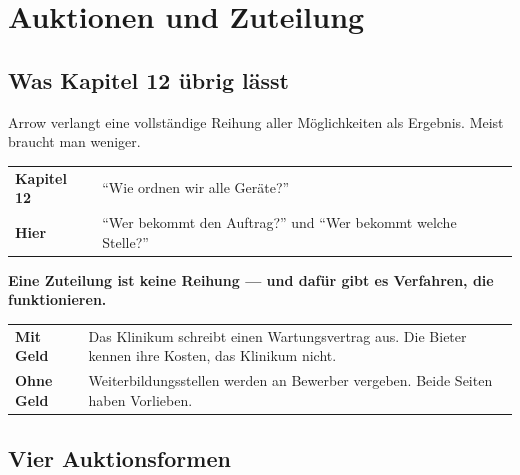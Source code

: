 \chapter{Auktionen und Zuteilung}

\section{Was Kapitel 12 übrig lässt}

\begin{merksatz}
Arrow verlangt eine vollständige Reihung aller Möglichkeiten als Ergebnis. Meist braucht man weniger.

\begin{center}
{\small
\renewcommand{\arraystretch}{1.5}
\begin{tabular}{@{}P{2.4cm}P{6.2cm}@{}}
\toprule
\textbf{Kapitel 12} & \enquote{Wie ordnen wir alle Geräte?}\\
\textbf{Hier} & \enquote{Wer bekommt den Auftrag?} und \enquote{Wer bekommt welche Stelle?}\\
\bottomrule
\end{tabular}}
\end{center}

\begin{center}
\begin{minipage}{0.9\textwidth}
\textbf{Eine Zuteilung ist keine Reihung --- und dafür gibt es Verfahren, die funktionieren.}
\end{minipage}
\end{center}

\begin{center}
{\small
\renewcommand{\arraystretch}{1.5}
\begin{tabular}{@{}P{2.4cm}P{6.2cm}@{}}
\toprule
\textbf{Mit Geld} & Das Klinikum schreibt einen Wartungsvertrag aus. Die Bieter kennen ihre Kosten, das Klinikum nicht.\\
\textbf{Ohne Geld} & Weiterbildungsstellen werden an Bewerber vergeben. Beide Seiten haben Vorlieben.\\
\bottomrule
\end{tabular}}
\end{center}
\end{merksatz}

\section{Vier Auktionsformen}

